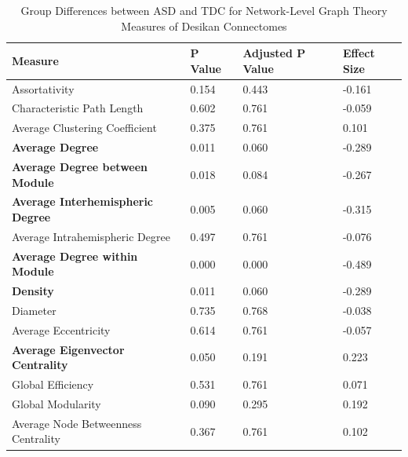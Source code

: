 \documentclass[11pt,conference]{IEEEtran}
\begin{document}
    \begin{table}
        \caption{Group Differences between ASD and TDC for Network-Level Graph Theory
                    Measures of Desikan Connectomes}
        \begin{center}
            \begin{tabular}{p{4cm}p{1cm}p{1cm}p{1cm}}
                \toprule
                                                Measure &  P Value &  Adjusted P Value &  Effect Size \\
                \midrule
                                            Assortativity &    0.154 &             0.443 &       -0.161 \\
                            Characteristic Path Length &    0.602 &             0.761 &       -0.059 \\
                        Average Clustering Coefficient &    0.375 &             0.761 &        0.101 \\
                                \textbf{Average Degree} &    0.011 &             0.060 &       -0.289 \\
                \textbf{Average Degree between Module} &    0.018 &             0.084 &       -0.267 \\
                \textbf{Average Interhemispheric Degree} &    0.005 &             0.060 &       -0.315 \\
                        Average Intrahemispheric Degree &    0.497 &             0.761 &       -0.076 \\
                    \textbf{Average Degree within Module} &    0.000 &             0.000 &       -0.489 \\
                                        \textbf{Density} &    0.011 &             0.060 &       -0.289 \\
                                                Diameter &    0.735 &             0.768 &       -0.038 \\
                                    Average Eccentricity &    0.614 &             0.761 &       -0.057 \\
                 \textbf{Average Eigenvector Centrality} &    0.050 &             0.191 &        0.223 \\
                                        Global Efficiency &    0.531 &             0.761 &        0.071 \\
                                        Global Modularity &    0.090 &             0.295 &        0.192 \\
                    Average Node Betweenness Centrality &    0.367 &             0.761 &        0.102 \\

\end{tabular}
\end{center}
\end{table}
\end{document}
